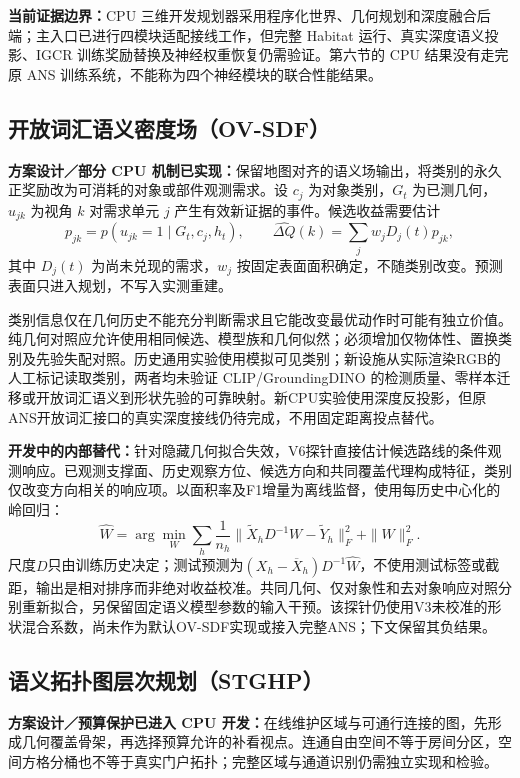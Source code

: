 \documentclass[11pt,a4paper]{article}
\begin{document}
\textbf{当前证据边界：}CPU 三维开发规划器采用程序化世界、几何规划和深度融合后端；主入口已进行四模块适配接线工作，但完整 Habitat 运行、真实深度语义投影、IGCR 训练奖励替换及神经权重恢复仍需验证。第六节的 CPU 结果没有走完原 ANS 训练系统，不能称为四个神经模块的联合性能结果。

\subsection{开放词汇语义密度场（OV-SDF）}
\label{sec:ovsdf}
\textbf{方案设计／部分 CPU 机制已实现：}保留地图对齐的语义场输出，将类别的永久正奖励改为可消耗的对象或部件观测需求。设 $c_j$ 为对象类别，$G_t$ 为已测几何，$u_{jk}$ 为视角 $k$ 对需求单元 $j$ 产生有效新证据的事件。候选收益需要估计
\begin{equation}
 p_{jk}=p(u_{jk}=1\mid G_t,c_j,h_t),\qquad
 \widehat{\Delta Q}(k)=\sum_j w_jD_j(t)p_{jk},
\end{equation}
其中 $D_j(t)$ 为尚未兑现的需求，$w_j$ 按固定表面面积确定，不随类别改变。预测表面只进入规划，不写入实测重建。

类别信息仅在几何历史不能充分判断需求且它能改变最优动作时可能有独立价值。纯几何对照应允许使用相同候选、模型族和几何似然；必须增加仅物体性、置换类别及先验失配对照。历史通用实验使用模拟可见类别；新设施从实际渲染RGB的人工标记读取类别，两者均未验证 CLIP/GroundingDINO 的检测质量、零样本迁移或开放词汇语义到形状先验的可靠映射。新CPU实验使用深度反投影，但原ANS开放词汇接口的真实深度接线仍待完成，不用固定距离投点替代。

\textbf{开发中的内部替代：}针对隐藏几何拟合失效，V6探针直接估计候选路线的条件观测响应。已观测支撑面、历史观察方位、候选方向和共同覆盖代理构成特征，类别仅改变方向相关的响应项。以面积率及F1增量为离线监督，使用每历史中心化的岭回归：
\begin{equation}
 \widehat W=\arg\min_W\sum_h\frac{1}{n_h}
 \|\widetilde X_hD^{-1}W-\widetilde Y_h\|_F^2+\|W\|_F^2.
\end{equation}
尺度$D$只由训练历史决定；测试预测为$(X_h-\overline X_h)D^{-1}\widehat W$，不使用测试标签或截距，输出是相对排序而非绝对收益校准。共同几何、仅对象性和去对象响应对照分别重新拟合，另保留固定语义模型参数的输入干预。该探针仍使用V3未校准的形状混合系数，尚未作为默认OV-SDF实现或接入完整ANS；下文保留其负结果。

\subsection{语义拓扑图层次规划（STGHP）}
\label{sec:stghp}
\textbf{方案设计／预算保护已进入 CPU 开发：}在线维护区域与可通行连接的图，先形成几何覆盖骨架，再选择预算允许的补看视点。连通自由空间不等于房间分区，空间方格分桶也不等于真实门户拓扑；完整区域与通道识别仍需独立实现和检验。
\end{document}
